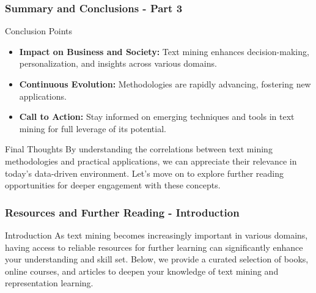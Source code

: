 \documentclass[aspectratio=169]{beamer}
\begin{document}
\begin{frame}[fragile]
    \frametitle{Summary and Conclusions - Part 3}
    \begin{block}{Conclusion Points}
        \begin{itemize}
            \item \textbf{Impact on Business and Society:}
            Text mining enhances decision-making, personalization, and insights across various domains.
            
            \item \textbf{Continuous Evolution:}
            Methodologies are rapidly advancing, fostering new applications.
            
            \item \textbf{Call to Action:}
            Stay informed on emerging techniques and tools in text mining for full leverage of its potential.
        \end{itemize}
    \end{block}

    \begin{block}{Final Thoughts}
        By understanding the correlations between text mining methodologies and practical applications, we can appreciate their relevance in today’s data-driven environment. Let's move on to explore further reading opportunities for deeper engagement with these concepts.
    \end{block}
\end{frame}

\begin{frame}[fragile]
    \frametitle{Resources and Further Reading - Introduction}
    \begin{block}{Introduction}
        As text mining becomes increasingly important in various domains, having access to reliable resources for further learning can significantly enhance your understanding and skill set. Below, we provide a curated selection of books, online courses, and articles to deepen your knowledge of text mining and representation learning.
    \end{block}
\end{frame}
\end{document}
